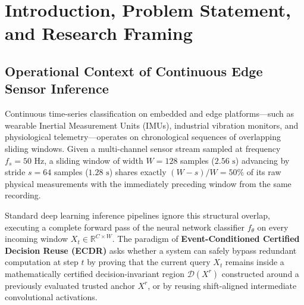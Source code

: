 \documentclass[11pt,a4paper]{article}
\newcommand{\R}{\mathbb{R}}
\newcommand{\Dset}{\mathcal{D}}
\theoremstyle{remark}
\begin{document}
\begingroup\small\setlength{\parskip}{1pt}\tableofcontents\endgroup
\clearpage

\section{Introduction, Problem Statement, and Research Framing}

\subsection{Operational Context of Continuous Edge Sensor Inference}
Continuous time-series classification on embedded and edge platforms---such as wearable Inertial Measurement Units (IMUs), industrial vibration monitors, and physiological telemetry---operates on chronological sequences of overlapping sliding windows. Given a multi-channel sensor stream sampled at frequency $f_s = 50\text{ Hz}$, a sliding window of width $W = 128$ samples ($2.56\text{ s}$) advancing by stride $s = 64$ samples ($1.28\text{ s}$) shares exactly $(W - s)/W = 50\%$ of its raw physical measurements with the immediately preceding window from the same recording.

Standard deep learning inference pipelines ignore this structural overlap, executing a complete forward pass of the neural network classifier $f_\theta$ on every incoming window $X_t \in \R^{C \times W}$. The paradigm of \textbf{Event-Conditioned Certified Decision Reuse (ECDR)} asks whether a system can safely bypass redundant computation at step $t$ by proving that the current query $X_t$ remains inside a mathematically certified decision-invariant region $\Dset(X^r)$ constructed around a previously evaluated trusted anchor $X^r$, or by reusing shift-aligned intermediate convolutional activations.
\end{document}

